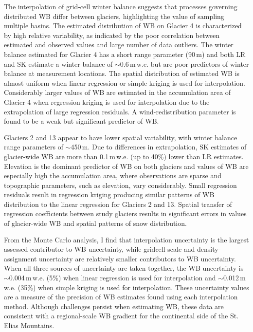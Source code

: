 \documentclass{sfuthesis}
\begin{document}
The interpolation of grid-cell winter balance suggests that processes governing distributed WB differ between glaciers, highlighting the value of sampling multiple basins. The estimated distribution of WB on Glacier 4 is characterized by high relative variability, as indicated by the poor correlation between estimated and observed values and large number of data outliers. The winter balance estimated for Glacier 4 has a short range parameter (90\,m) and both LR and SK estimate a winter balance of $\sim$0.6\,m\,w.e. but are poor predictors of winter balance at measurement locations. The spatial distribution of estimated WB is almost uniform when linear regression or simple kriging is used for interpolation. Considerably larger values of WB are estimated in the accumulation area of Glacier 4 when regression kriging is used for interpolation due to the extrapolation of large regression residuals. A wind-redistribution parameter is found to be a weak but significant predictor of WB. 

Glaciers 2 and 13 appear to have lower spatial variability, with winter balance range parameters of $\sim$450\,m. Due to differences in extrapolation, SK estimates of glacier-wide WB are more than 0.1\,m\,w.e. (up to 40\%) lower than LR estimates. Elevation is the dominant predictor of WB on both glaciers and values of WB are especially high the accumulation area, where observations are sparse and topographic parameters, such as elevation, vary considerably. Small regression residuals result in regression kriging producing similar patterns of WB distribution to the linear regression for Glaciers 2 and 13. Spatial transfer of regression coefficients between study glaciers results in significant errors in values of glacier-wide WB and spatial patterns of snow distribution.

From the Monte Carlo analysis, I find that interpolation uncertainty is the largest assessed contributor to WB uncertainty, while gridcell-scale and density-assignment uncertainty are relatively smaller contributors to WB uncertainty. When all three sources of uncertainty are taken together, the WB uncertainty is $\sim$0.004\,m\,w.e. (5\%) when linear regression is used for interpolation and $\sim$0.012\,m\,w.e. (35\%) when simple kriging is used for interpolation. These uncertainty values are a measure of the precision of WB estimates found using each interpolation method. Although challenges persist when estimating WB, these data are consistent with a regional-scale WB gradient for the continental side of the St. Elias Mountains.
\end{document}
